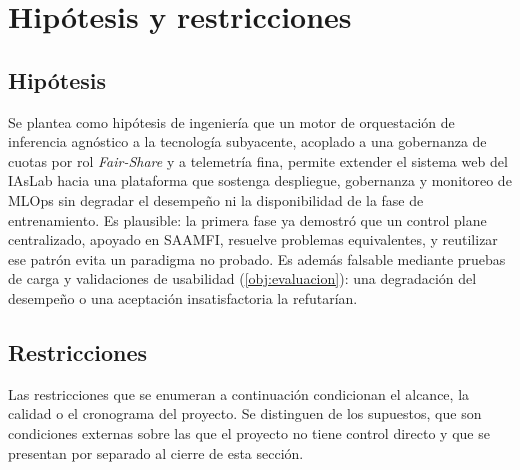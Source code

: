 %
\chapter{Hipótesis y restricciones}\label{cha:hipotesis-restricciones}

\section{Hipótesis}

Se plantea como hipótesis de ingeniería que un motor de orquestación de inferencia agnóstico a la tecnología subyacente, acoplado a una gobernanza de cuotas por rol \emph{Fair-Share} y a telemetría fina, permite extender el sistema web del IAsLab hacia una plataforma que sostenga despliegue, gobernanza y monitoreo de MLOps sin degradar el desempeño ni la disponibilidad de la fase de entrenamiento. Es plausible: la primera fase ya demostró que un control plane centralizado, apoyado en SAAMFI, resuelve problemas equivalentes, y reutilizar ese patrón evita un paradigma no probado. Es además falsable mediante pruebas de carga y validaciones de usabilidad (\cref{obj:evaluacion}): una degradación del desempeño o una aceptación insatisfactoria la refutarían.

\section{Restricciones}

Las restricciones que se enumeran a continuación condicionan el alcance, la calidad o el cronograma del proyecto. Se distinguen de los supuestos, que son condiciones externas sobre las que el proyecto no tiene control directo y que se presentan por separado al cierre de esta sección.

